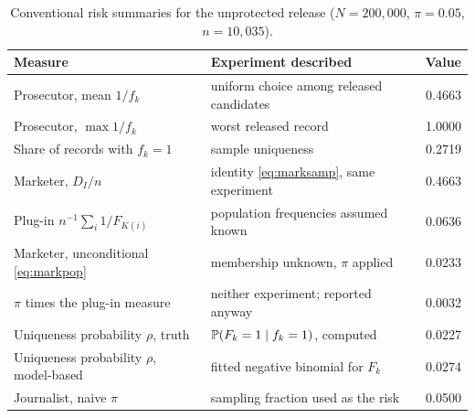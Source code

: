\begin{table}[t]
\centering
\caption{Conventional risk summaries for the unprotected release ($N = 200{,}000$, $\pi = 0.05$, $n = 10{,}035$).}
\label{tab:measures}
\begin{tabular}{llr}
\toprule
Measure & Experiment described & Value \\
\midrule
Prosecutor, mean $1/f_k$ & uniform choice among released candidates & 0.4663 \\
Prosecutor, $\max 1/f_k$ & worst released record & 1.0000 \\
Share of records with $f_k = 1$ & sample uniqueness & 0.2719 \\
Marketer, $D_I/n$ & identity \eqref{eq:marksamp}, same experiment & 0.4663 \\
Plug-in $n^{-1}\sum_i 1/F_{K(i)}$ & population frequencies assumed known & 0.0636 \\
Marketer, unconditional \eqref{eq:markpop} & membership unknown, $\pi$ applied & 0.0233 \\
$\pi$ times the plug-in measure & neither experiment; reported anyway & 0.0032 \\
Uniqueness probability $\rho$, truth & $\mathbb{P}(F_k = 1 \mid f_k = 1)$, computed & 0.0227 \\
Uniqueness probability $\rho$, model-based & fitted negative binomial for $F_k$ & 0.0274 \\
Journalist, naive $\pi$ & sampling fraction used as the risk & 0.0500 \\
\bottomrule
\end{tabular}
\end{table}
